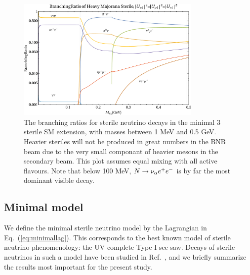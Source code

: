 \documentclass[11pt, a4paper]{article}
\newcommand{\refeq}[1]{Eq.~(\ref{#1})}
\newcommand{\refref}[1]{Ref.~\cite{#1}}
\def\ster{\ensuremath N}
\begin{document}
\begin{figure}[t]
%
\centering
%
\includegraphics[width=0.8\textwidth]{figures/bounds1.pdf}
%
%
\caption{\label{fig:branchingratios}The branching ratios for sterile neutrino
decays in the minimal 3 sterile SM extension, with masses between 1 MeV and 0.5
GeV. Heavier steriles will not be produced in great numbers in the BNB beam due
to the very small componant of heavier mesons in the secondary beam. This plot
assumes equal mixing with all active flavours. Note that below 100 MeV, $\ster
\rightarrow \nu_\alpha e^+ e^-$ is by far the most dominant visible decay.}
%
\end{figure}

\subsection{Minimal model}

We define the minimal sterile neutrino model by the Lagrangian in
\refeq{eq:minimallag}. This corresponds to the best known model of sterile
neutrino phenomenology: the UV-complete Type I see-saw. Decays of sterile
neutrinos in such a model have been studied in \refref{Atre:2009rg}, and we
briefly summarize the results most important for the present study.
\end{document}
